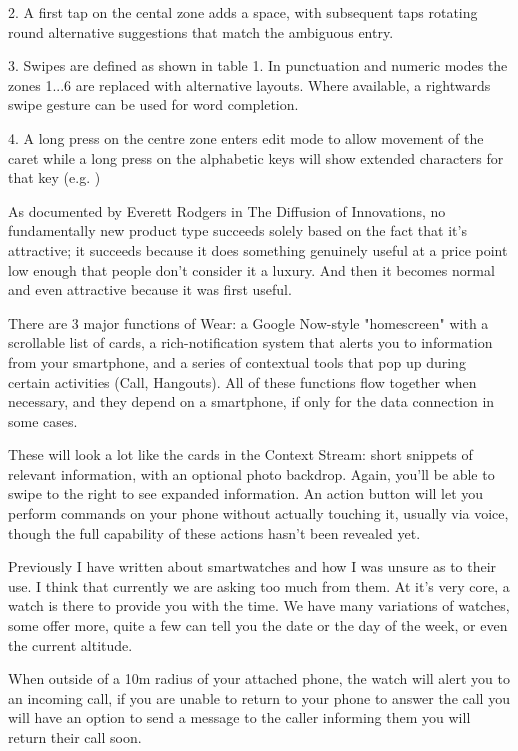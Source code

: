 \documentclass{article}
\begin{document}
2. A first tap on the cental zone adds a space, with subsequent taps rotating round alternative suggestions that match the ambiguous entry. 

3. Swipes are defined as shown in table 1. In punctuation and numeric modes the zones 1...6 are replaced with alternative layouts. Where available, a rightwards swipe gesture can be used for word completion. 

4. A long press on the centre zone enters edit mode to allow movement of the caret while a long press on the alphabetic keys will show extended characters for that key (e.g. )

As documented by Everett Rodgers in The Diffusion of Innovations, no fundamentally new product type succeeds solely based on the fact that it’s attractive; it succeeds because it does something genuinely useful at a price point low enough that people don’t consider it a luxury. And then it becomes normal and even attractive because it was first useful.

There are 3 major functions of Wear: a Google Now-style "homescreen" with a scrollable list of cards, a rich-notification system that alerts you to information from your smartphone, and a series of contextual tools that pop up during certain activities (Call, Hangouts). All of these functions flow together when necessary, and they depend on a smartphone, if only for the data connection in some cases.

These will look a lot like the cards in the Context Stream: short snippets of relevant information, with an optional photo backdrop. Again, you'll be able to swipe to the right to see expanded information. An action button will let you perform commands on your phone without actually touching it, usually via voice, though the full capability of these actions hasn't been revealed yet.
 
Previously I have written about smartwatches and how I was unsure as to their use. I think that currently we are asking too much from them. At it’s very core, a watch is there to provide you with the time. We have many variations of watches, some offer more, quite a few can tell you the date or the day of the week, or even the current altitude.

When outside of a 10m radius of your attached phone, the watch will alert you to an incoming call, if you are unable to return to your phone to answer the call you will have an option to send a message to the caller informing them you will return their call soon.



\end{document}

